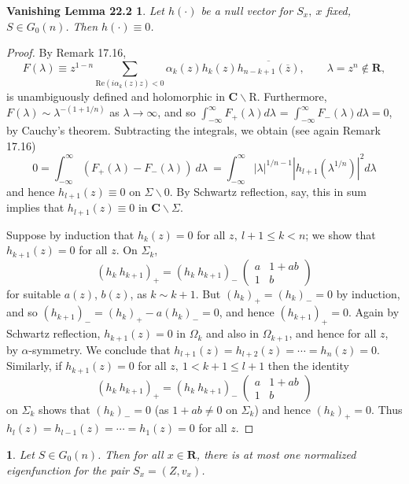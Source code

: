 \documentclass{surv-l}
\theoremstyle{plain}
\newtheorem*{vl}{\sc Vanishing Lemma 22.2}
\newtheorem{cor}[theorem]{\sc{Corollary}}
\theoremstyle{definition}
\numberwithin{equation}{chapter}
\begin{document}
\begin{vl}
Let $h(\cdot)$ be a null vector for $S_{x},\ x$ fixed, $S\in G_{0}(n)$. Then $h(\cdot)\equiv 0$.
\end{vl}

\begin{proof}
By Remark 17.16,
\begin{equation*}
F(\lambda)\equiv z^{1-n}\sum_{\mathrm{Re}(i\alpha_{k}(z)z)<0} \alpha_{k}(z)h_{k}(z)\overline{h_{n-k+1}(\overline{z})},\qquad \lambda=z^{n}\not\in \mathbf{R},
\end{equation*}
is unambiguously defined and holomorphic in $\mathbf{C}\backslash \mathrm{R}$. Furthermore, $F(\lambda)\sim \lambda^{-(1+1/n)}$ as $\lambda \rightarrow\infty$, and so $\int_{-\infty}^{\infty}F_{+}(\lambda)  d\lambda$ = $\int_{-\infty}^{\infty}F_{-}(\lambda)d\lambda=0$, by Cauchy's theorem. Subtracting the integrals, we obtain (see again Remark 17.16)
\begin{equation*}
0=\int_{-\infty}^{\infty}(F_{+}(\lambda)-F_{-}(\lambda))\  d\lambda\ = \int_{-\infty}^{\infty}|\lambda|^{1/n-1}|h_{l+1}(\lambda^{1/n})|^{2}d\lambda
\end{equation*}
and hence $h_{l+1}(z)\equiv 0$ on $\Sigma\backslash 0$. By Schwartz reflection, say, this in sum implies that $h_{l+1}(z)\equiv 0$ in $ \textbf{C}\backslash \Sigma$.

Suppose by induction that $h_{k}(z)=0$ for all $z,\ l+1\leq k<n$; we show that $h_{k+1}(z)=0$ for all $z$. On $\Sigma_{k}$,
\begin{equation*}
(h_{k}\ h_{k+1})_{+}=(h_{k}\ h_{k+1})_{-}\ \left(\begin{array}{cc}
a & 1+ab\\
1 & b
\end{array}\right)
\end{equation*}
for suitable $a(z)$, $b(z)$, as $k\sim k+1$. But $(h_{k})_{+}=(h_{k})_{-}=0$ by induction, and so $(h_{k+1})_{-}=(h_{k})_{+}-a(h_{k})_{-}=0$, and hence $(h_{k+1})_{+}=0$. Again by Schwartz reflection, $h_{k+1}(z) =0$ in $\Omega_{k}$ and also in $\Omega_{k+1}$, and hence for all $z$, by $\alpha$-symmetry. We conclude that $h_{l+1}(z)=h_{l+2}(z) = \cdots =h_{n}(z)=0$. Similarly, if $h_{k+1}(z)=0$ for all $z,\ 1<k+1\leq l+1$ then the identity
\begin{equation*}
(h_{k}\ h_{k+1})_{+}=(h_{k}\ h_{k+1})_{-}\ \left(\begin{array}{cc}
a & 1+ab\\
1 & b
\end{array}\right)
\end{equation*}
on $\Sigma_{k}$ shows that $(h_{k})_{-}=0$ (as ${1}+ ab\neq 0$ on $\Sigma_{k}$) and hence $(h_{k})_{+}=0$. Thus $h_{l}(z)=h_{l-1}(z)=\cdots= h_{1}(z)=0$ for all $z$.
\end{proof}
\setcounter{theorem}{2}
\begin{cor}\label{coro22.3}
Let $S\in G_{0}(n)$. Then for all $x\in \mathbf{R}$, there is at most one normalized eigenfunction for the pair $S_{x}=(Z, v_{x})$.
\end{cor}
\end{document}
